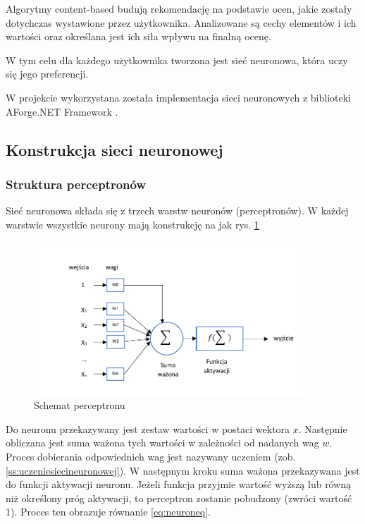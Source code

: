 \documentclass[twoside]{iisthesis}
\begin{document}
		 Algorytmy content-based budują rekomendację na podstawie ocen, jakie zostały dotychczas wystawione przez użytkownika. Analizowane są cechy elementów i ich wartości oraz określana jest ich siła wpływu na finalną ocenę. 
		 
		 W tym celu dla każdego użytkownika tworzona jest sieć neuronowa, która uczy się jego preferencji. 
		 
		 W projekcie wykorzystana została implementacja sieci neuronowych z biblioteki AForge.NET Framework \cite{aforgenet}.
	 
		 \subsection{Konstrukcja sieci neuronowej}
		 
		 \subsubsection{Struktura perceptronów}
		 \label{sss:strukturaperceptronow}
		 
		 Sieć neuronowa składa się z trzech warstw neuronów (perceptronów). W każdej warstwie wszystkie neurony mają konstrukcję na jak rys. \ref{fig:schematneuronu}
		 
 		 \begin{figure}[!ht] 		 		 	
	 		 	\includegraphics[width=0.9\textwidth]{schematneuron}
	 		 	\caption{Schemat perceptronu}
	 		 	\label{fig:schematneuronu}
 		 \end{figure}
		 
		 Do neuronu przekazywany jest zestaw wartości w postaci wektora $x$. Następnie obliczana jest suma ważona tych wartości w zależności od nadanych wag $w$. Proces dobierania odpowiednich wag jest nazywany uczeniem (zob. \ref{ss:uczeniesiecineuronowej}). W następnym kroku suma ważona przekazywana jest do funkcji aktywacji neuronu. Jeżeli funkcja przyjmie wartość wyższą lub równą niż określony próg aktywacji, to perceptron zostanie pobudzony (zwróci wartość 1). Proces ten obrazuje równanie \ref{eq:neuroneq}.
		 
\end{document}
